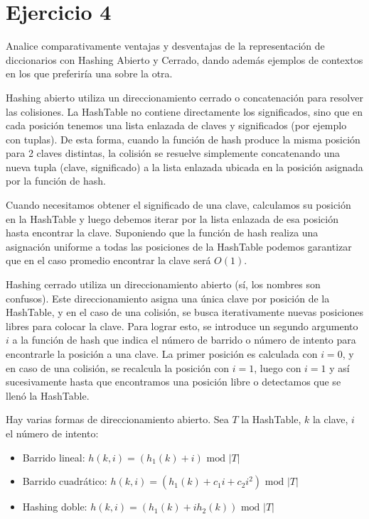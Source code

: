 \section*{Ejercicio 4}

Analice comparativamente ventajas y desventajas de la representación de diccionarios con Hashing Abierto y Cerrado, dando además ejemplos de contextos en los que preferiría una sobre la otra.

Hashing abierto utiliza un direccionamiento cerrado o concatenación para resolver las colisiones. La HashTable no contiene directamente los significados, sino que en cada posición tenemos una lista enlazada de claves y significados (por ejemplo con tuplas). De esta forma, cuando la función de hash produce la misma posición para 2 claves distintas, la colisión se resuelve simplemente concatenando una nueva tupla (clave, significado) a la lista enlazada ubicada en la posición asignada por la función de hash.

Cuando necesitamos obtener el significado de una clave, calculamos su posición en la HashTable y luego debemos iterar por la lista enlazada de esa posición hasta encontrar la clave. Suponiendo que la función de hash realiza una asignación uniforme a todas las posiciones de la HashTable podemos garantizar que en el caso promedio encontrar la clave será $O(1)$.

Hashing cerrado utiliza un direccionamiento abierto (sí, los nombres son confusos). Este direccionamiento asigna una única clave por posición de la HashTable, y en el caso de una colisión, se busca iterativamente nuevas posiciones libres para colocar la clave. Para lograr esto, se introduce un segundo argumento $i$ a la función de hash que indica el número de barrido o número de intento para encontrarle la posición a una clave. La primer posición es calculada con $i=0$, y en caso de una colisión, se recalcula la posición con $i=1$, luego con $i=1$ y así sucesivamente hasta que encontramos una posición libre o detectamos que se llenó la HashTable.

Hay varias formas de direccionamiento abierto. Sea $T$ la HashTable, $k$ la clave, $i$ el número de intento:

\begin{itemize}
    \item Barrido lineal: $h(k, i) = (h_1(k) + i) \text{ mod } |T|$
    \item Barrido cuadrático: $h(k, i) = (h_1(k) + c_1 i + c_2 i^2) \text{ mod } |T|$
    \item Hashing doble: $h(k, i) = (h_1(k) + i h_2(k)) \text{ mod } |T|$
\end{itemize}

